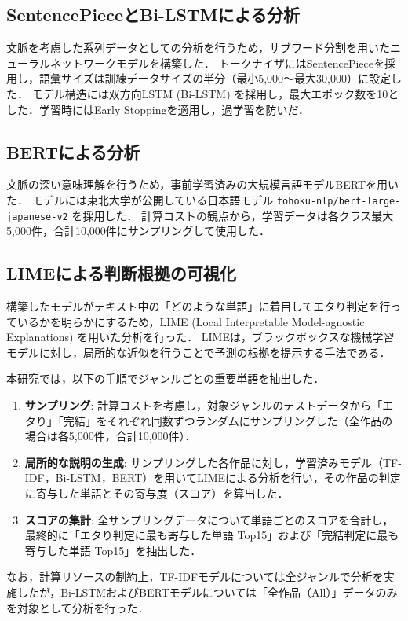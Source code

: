 \documentclass[uplatex, dvipdfmx, 11pt, a4paper, report]{jsbook}
\begin{document}
\subsection{SentencePieceとBi-LSTMによる分析}
文脈を考慮した系列データとしての分析を行うため，サブワード分割を用いたニューラルネットワークモデルを構築した．
トークナイザにはSentencePiece\cite{sentencepiece}を採用し，語彙サイズは訓練データサイズの半分（最小5,000〜最大30,000）に設定した．
モデル構造には双方向LSTM (Bi-LSTM) を採用し，最大エポック数を10とした．学習時にはEarly Stoppingを適用し，過学習を防いだ．

\subsection{BERTによる分析}
文脈の深い意味理解を行うため，事前学習済みの大規模言語モデルBERTを用いた．
モデルには東北大学が公開している日本語モデル \texttt{tohoku-nlp/bert-large-japanese-v2} を採用した．
計算コストの観点から，学習データは各クラス最大5,000件，合計10,000件にサンプリングして使用した．

\subsection{LIMEによる判断根拠の可視化}
構築したモデルがテキスト中の「どのような単語」に着目してエタり判定を行っているかを明らかにするため，LIME (Local Interpretable Model-agnostic Explanations) を用いた分析を行った．
LIMEは，ブラックボックスな機械学習モデルに対し，局所的な近似を行うことで予測の根拠を提示する手法である．

本研究では，以下の手順でジャンルごとの重要単語を抽出した．
\begin{enumerate}
  \item \textbf{サンプリング}: 
  計算コストを考慮し，対象ジャンルのテストデータから「エタり」「完結」をそれぞれ同数ずつランダムにサンプリングした（全作品の場合は各5,000件，合計10,000件）．
  \item \textbf{局所的な説明の生成}: 
  サンプリングした各作品に対し，学習済みモデル（TF-IDF，Bi-LSTM，BERT）を用いてLIMEによる分析を行い，その作品の判定に寄与した単語とその寄与度（スコア）を算出した．
  \item \textbf{スコアの集計}: 
  全サンプリングデータについて単語ごとのスコアを合計し，最終的に「エタり判定に最も寄与した単語 Top15」および「完結判定に最も寄与した単語 Top15」を抽出した．
\end{enumerate}

なお，計算リソースの制約上，TF-IDFモデルについては全ジャンルで分析を実施したが，Bi-LSTMおよびBERTモデルについては「全作品（All）」データのみを対象として分析を行った．
\end{document}
